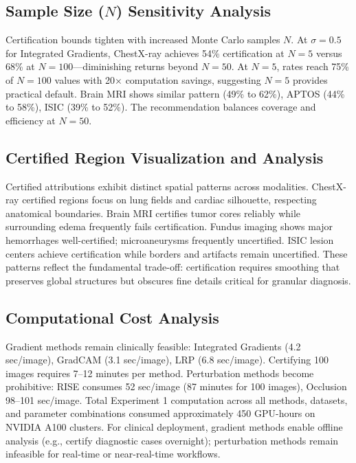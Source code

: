 \documentclass[11pt]{article}
\begin{document}
\subsection{Sample Size ($N$) Sensitivity Analysis}

Certification bounds tighten with increased Monte Carlo samples $N$. At $\sigma=0.5$ for Integrated Gradients, ChestX-ray achieves 54\% certification at $N=5$ versus 68\% at $N=100$—diminishing returns beyond $N=50$. At $N=5$, rates reach 75\% of $N=100$ values with 20× computation savings, suggesting $N=5$ provides practical default. Brain MRI shows similar pattern (49\% to 62\%), APTOS (44\% to 58\%), ISIC (39\% to 52\%). The recommendation balances coverage and efficiency at $N=50$.

\subsection{Certified Region Visualization and Analysis}

Certified attributions exhibit distinct spatial patterns across modalities. ChestX-ray certified regions focus on lung fields and cardiac silhouette, respecting anatomical boundaries. Brain MRI certifies tumor cores reliably while surrounding edema frequently fails certification. Fundus imaging shows major hemorrhages well-certified; microaneurysms frequently uncertified. ISIC lesion centers achieve certification while borders and artifacts remain uncertified. These patterns reflect the fundamental trade-off: certification requires smoothing that preserves global structures but obscures fine details critical for granular diagnosis.

\subsection{Computational Cost Analysis}

Gradient methods remain clinically feasible: Integrated Gradients (4.2 sec/image), GradCAM (3.1 sec/image), LRP (6.8 sec/image). Certifying 100 images requires 7–12 minutes per method. Perturbation methods become prohibitive: RISE consumes 52 sec/image (87 minutes for 100 images), Occlusion 98–101 sec/image. Total Experiment 1 computation across all methods, datasets, and parameter combinations consumed approximately 450 GPU-hours on NVIDIA A100 clusters. For clinical deployment, gradient methods enable offline analysis (e.g., certify diagnostic cases overnight); perturbation methods remain infeasible for real-time or near-real-time workflows.
\end{document}
